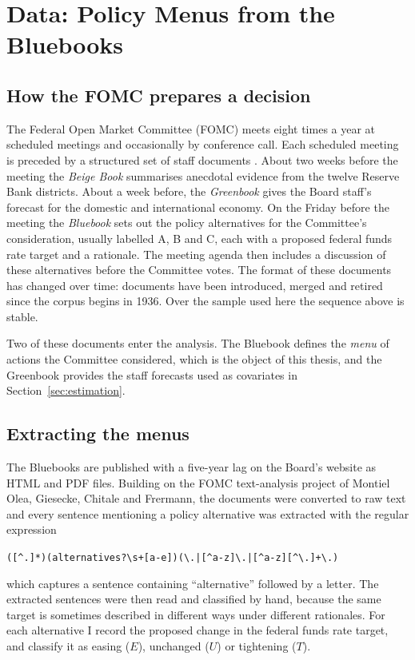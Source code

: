 \section{Data: Policy Menus from the Bluebooks}\label{sec:data}

\subsection{How the FOMC prepares a decision}

The Federal Open Market Committee (FOMC) meets eight times a year at scheduled meetings and occasionally by
conference call. Each scheduled meeting is preceded by a structured set of staff documents
\citep{danker2005}. About two weeks before the meeting the \emph{Beige Book} summarises anecdotal evidence from
the twelve Reserve Bank districts. About a week before, the \emph{Greenbook} gives the Board staff's forecast for
the domestic and international economy. On the Friday before the meeting the \emph{Bluebook} sets out the policy
alternatives for the Committee's consideration, usually labelled A, B and C, each with a proposed federal funds
rate target and a rationale. The meeting agenda then includes a discussion of these alternatives before the
Committee votes. The format of these documents has changed over time: documents have been introduced, merged and
retired since the corpus begins in 1936. Over the sample used here the sequence above is stable.

Two of these documents enter the analysis. The Bluebook defines the \emph{menu} of actions the Committee
considered, which is the object of this thesis, and the Greenbook provides the staff forecasts used as
covariates in Section~\ref{sec:estimation}.

\subsection{Extracting the menus}

The Bluebooks are published with a five-year lag on the Board's website as HTML and PDF files. Building on the
FOMC text-analysis project of Montiel Olea, Giesecke, Chitale and Frermann, the documents were converted to raw
text and every sentence mentioning a policy alternative was extracted with the regular expression
\begin{center}
\small\verb/([^.]*)(alternatives?\s+[a-e])(\.|[^a-z]\.|[^a-z][^\.]+\.)/
\end{center}
which captures a sentence containing ``alternative'' followed by a letter. The extracted sentences were then
read and classified by hand, because the same target is sometimes described in different ways under different
rationales. For each alternative I record the proposed change in the federal funds rate target, and classify it
as easing ($E$), unchanged ($U$) or tightening ($T$).

